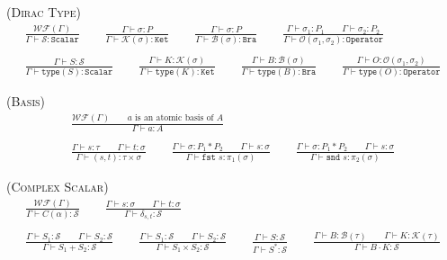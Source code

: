 \documentclass[manuscript, review, timestamp]{acmart}
\newcommand*{\Sc}{\mathcal{S}}
\newcommand*{\K}{\mathcal{K}}
\newcommand*{\B}{\mathcal{B}}
\newcommand*{\Op}{\mathcal{O}}
\newcommand*{\type}{\texttt{type}}
\newcommand*{\fst}{\texttt{fst }}
\newcommand*{\snd}{\texttt{snd }}
\begin{document}
\textsc{(Dirac Type)}
\begin{gather*}
  \frac{\mathcal{WF}(\Gamma)}{\Gamma \vdash \Sc : \texttt{Scalar}}
  \qquad
  \frac{\Gamma \vdash \sigma : P}{\Gamma \vdash \K(\sigma) : \texttt{Ket}}
  \qquad
  \frac{\Gamma \vdash \sigma : P}{\Gamma \vdash \B(\sigma) : \texttt{Bra}}
  \qquad
  \frac{\Gamma \vdash \sigma_1 : P_1 \qquad \Gamma \vdash \sigma_2 : P_2}{\Gamma \vdash \Op(\sigma_1, \sigma_2) : \texttt{Operator}} \\
  \\
  \frac{\Gamma \vdash S : \Sc}{\Gamma \vdash \type(S) : \texttt{Scalar}}
  \qquad
  \frac{\Gamma \vdash K : \K(\sigma)}{\Gamma \vdash \type(K) : \texttt{Ket}}
  \qquad
  \frac{\Gamma \vdash B : \B(\sigma)}{\Gamma \vdash \type(B) : \texttt{Bra}}
  \qquad
  \frac{\Gamma \vdash O : \Op(\sigma_1, \sigma_2)}{\Gamma \vdash \type(O) : \texttt{Operator}}
\end{gather*}

\textsc{(Basis)}
\begin{gather*}
  \frac{\mathcal{WF}(\Gamma) \qquad a \text{ is an atomic basis of } A}{\Gamma \vdash a : A} \\
  \\
  \frac{\Gamma \vdash s : \tau \qquad \Gamma \vdash t : \sigma}{\Gamma \vdash (s, t) :  \tau \times \sigma }
  \qquad
  \frac{\Gamma \vdash \sigma : P_1 * P_2 \qquad \Gamma \vdash s : \sigma }{\Gamma \vdash \fst s : \pi_1(\sigma)}
  \qquad
  \frac{\Gamma \vdash \sigma : P_1 * P_2 \qquad \Gamma \vdash s : \sigma }{\Gamma \vdash \snd s : \pi_2(\sigma)}
\end{gather*}

\textsc{(Complex Scalar)}
\begin{gather*}
  \frac{\mathcal{WF}(\Gamma)}{\Gamma \vdash C(\alpha) : \Sc}
  \qquad
  \frac{\Gamma \vdash s : \sigma \qquad \Gamma \vdash t : \sigma}{\Gamma \vdash \delta_{s, t} : \Sc} \\
  \\
  \frac{\Gamma \vdash S_1 : \Sc \qquad \Gamma \vdash S_2 : \Sc }{\Gamma \vdash S_1 + S_2 : \Sc }
  \qquad
  \frac{\Gamma \vdash S_1 : \Sc \qquad \Gamma \vdash S_2 : \Sc}{\Gamma \vdash S_1 \times S_2 : \Sc}
  \qquad
  \frac{\Gamma \vdash S : \Sc}{\Gamma \vdash S^* : \Sc}
  \qquad
  \frac{\Gamma \vdash B: \B(\tau) \qquad \Gamma \vdash K : \K(\tau) }{\Gamma \vdash B \cdot K : \Sc }
\end{gather*}
\end{document}
